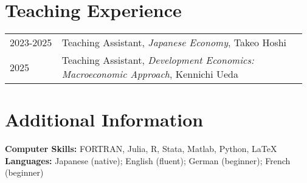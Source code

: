\documentclass[11pt]{article}
\begin{document}
\section*{Teaching Experience}
\begin{tabular}{p{0.17\linewidth} p{0.80\linewidth}}
2023-2025 & Teaching Assistant, \textit{Japanese Economy}, Takeo Hoshi\\[2pt]
2025      & Teaching Assistant, \textit{Development Economics: Macroeconomic Approach}, Kennichi Ueda\\[2pt]
\end{tabular}

\section*{Additional Information}
\textbf{Computer Skills:} FORTRAN, Julia, R, Stata, Matlab, Python, \LaTeX\newline
\textbf{Languages:} Japanese (native); English (fluent); German (beginner); French (beginner)
\end{document}
